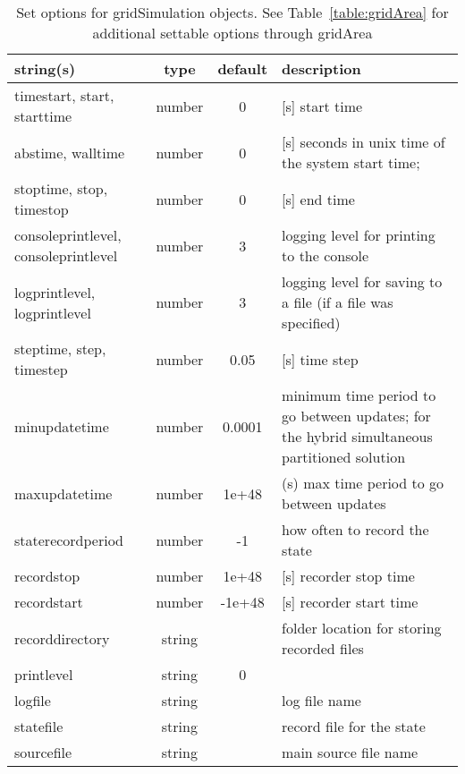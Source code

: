 \begin{table}[ht]
\centering
\begin{tabular}{p{5cm} c c p{7cm}}
\hline
string(s) & type & default & description \\
\hline
timestart, start, starttime & number & 0 & [s]  start time\\
abstime, walltime & number & 0 & [s] seconds in unix time of the system start time;\\
stoptime, stop, timestop & number & 0 & [s]  end time\\
consoleprintlevel, consoleprintlevel & number & 3 & logging level for printing to the console\\
logprintlevel, logprintlevel & number & 3 & logging level for saving to a file (if a file was specified)\\
steptime, step, timestep & number & 0.05 & [s]  time step\\
minupdatetime & number & 0.0001 & minimum time period to go between updates; for the hybrid simultaneous partitioned solution\\
maxupdatetime & number & 1e+48 & (s) max time period to go between updates\\
staterecordperiod & number & -1 & how often to record the state\\
recordstop & number & 1e+48 & [s]  recorder stop time\\
recordstart & number & -1e+48 & [s]  recorder start time\\
recorddirectory & string &  & folder location for storing recorded files\\
printlevel & string & 0 & \\
logfile & string &  & log file name\\
statefile & string &  & record file for the state\\
sourcefile & string &  & main source file name\\
\hline
\end{tabular}
\caption{Set options for gridSimulation objects. See Table~\ref{table:gridArea} for additional settable options through gridArea}
\label{table:gridSimulation}
\end{table}

